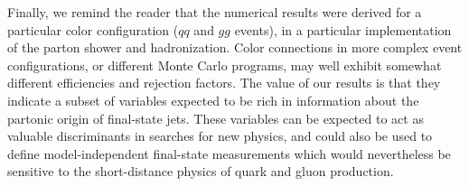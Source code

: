Finally, we remind the reader that the numerical results were derived for a particular color
configuration ($qq$ and $gg$ events), in a particular implementation of the parton shower and hadronization. Color
connections in more complex event configurations, or different Monte Carlo programs,
may well exhibit somewhat different efficiencies and rejection factors. The value of our results
is that they indicate a subset of variables expected to be rich in information about
the partonic origin of final-state jets. These variables can  be expected to act as valuable
discriminants in searches for new physics, and could also be used to define 
model-independent final-state measurements which would nevertheless be sensitive to the
short-distance physics of quark and gluon production.
 